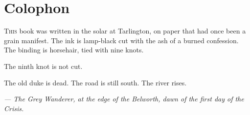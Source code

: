 \documentclass[11pt]{book}
\begin{document}
\clearpage
\chapter*{Colophon}
\lettrine{T}{his} book was written in the solar at Tarlington, on paper that had once been a grain manifest. The ink is lamp‑black cut with the ash of a burned confession. The binding is horsehair, tied with nine knots.

The ninth knot is not cut.

The old duke is dead. The road is still south. The river rises.

\vspace{1em}
\noindent\textit{--- The Grey Wanderer, at the edge of the Belworth, dawn of the first day of the Crisis.}
\end{document}
